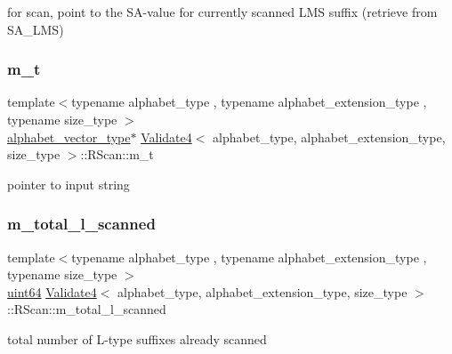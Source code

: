 for scan, point to the S\+A-\/value for currently scanned L\+MS suffix (retrieve from S\+A\+\_\+\+L\+MS) 

\mbox{\label{struct_validate4_1_1_r_scan_a9d9ce16aa2eacc32f54cc88e8746a73a}} 
\subsubsection{\texorpdfstring{m\+\_\+t}{m\_t}}
{\footnotesize\ttfamily template$<$typename alphabet\+\_\+type , typename alphabet\+\_\+extension\+\_\+type , typename size\+\_\+type $>$ \\
\hyperlink{class_validate4_a49c80b3d101be19542a4341c2387603a}{alphabet\+\_\+vector\+\_\+type}$\ast$ \hyperlink{class_validate4}{Validate4}$<$ alphabet\+\_\+type, alphabet\+\_\+extension\+\_\+type, size\+\_\+type $>$\+::R\+Scan\+::m\+\_\+t\hspace{0.3cm}{\ttfamily [private]}}



pointer to input string 

\mbox{\label{struct_validate4_1_1_r_scan_ae0c9b8ab74cca6cebf6375cd772f1858}} 
\subsubsection{\texorpdfstring{m\+\_\+total\+\_\+l\+\_\+scanned}{m\_total\_l\_scanned}}
{\footnotesize\ttfamily template$<$typename alphabet\+\_\+type , typename alphabet\+\_\+extension\+\_\+type , typename size\+\_\+type $>$ \\
\hyperlink{types_8h_a60e8696a4678cd348e991a1f172e53f7}{uint64} \hyperlink{class_validate4}{Validate4}$<$ alphabet\+\_\+type, alphabet\+\_\+extension\+\_\+type, size\+\_\+type $>$\+::R\+Scan\+::m\+\_\+total\+\_\+l\+\_\+scanned\hspace{0.3cm}{\ttfamily [private]}}



total number of L-\/type suffixes already scanned 

